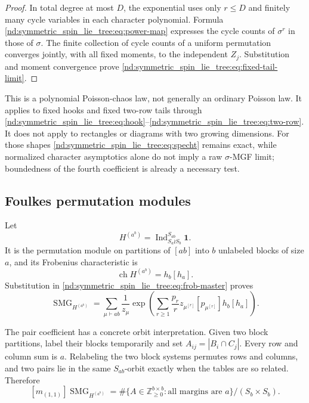 \documentclass[10pt]{article}
\newcommand{\SMG}{\operatorname{SMG}}
\newcommand{\MGF}{\SMG}
\newcommand{\Ind}{\operatorname{Ind}}
\newcommand{\ch}{\operatorname{ch}}
\begin{document}
\begin{proof}
In total degree at most $D$, the exponential uses only $r\le D$ and finitely
many cycle variables in each character polynomial.  Formula
\eqref{nd:symmetric_spin_lie_tree:eq:power-map} expresses the cycle counts of $\sigma^r$ in those of
$\sigma$.  The finite collection of cycle counts of a uniform permutation
converges jointly, with all fixed moments, to the independent $Z_j$.
Substitution and moment convergence prove \eqref{nd:symmetric_spin_lie_tree:eq:fixed-tail-limit}.
\end{proof}

This is a polynomial Poisson-chaos law, not generally an ordinary Poisson
law.  It applies to fixed hooks and fixed two-row tails through
\eqref{nd:symmetric_spin_lie_tree:eq:hook}--\eqref{nd:symmetric_spin_lie_tree:eq:two-row}.  It does not apply to rectangles or
diagrams with two growing dimensions.  For those shapes \eqref{nd:symmetric_spin_lie_tree:eq:specht}
remains exact, while normalized character asymptotics alone do not imply a
raw $\sigma$-MGF limit; boundedness of the fourth coefficient is already a
necessary test.

\subsection{Foulkes permutation modules}

Let
\[
 H^{(a^b)}=\Ind_{S_a\wr S_b}^{S_{ab}}\mathbf1.
\]
It is the permutation module on partitions of $[ab]$ into $b$ unlabeled
blocks of size $a$, and its Frobenius characteristic is
\[
 \ch H^{(a^b)}=h_b[h_a].
\]
Substitution in \eqref{nd:symmetric_spin_lie_tree:eq:frob-master} proves
\begin{equation}\label{nd:symmetric_spin_lie_tree:eq:foulkes}
 \boxed{
 \MGF_{H^{(a^b)}}=
 \sum_{\mu\vdash ab}\frac1{z_\mu}
 \exp\!\left(
 \sum_{r\ge1}\frac{p_r}{r}
 z_{\mu^{[r]}}[p_{\mu^{[r]}}]h_b[h_a]
 \right).}
\end{equation}

The pair coefficient has a concrete orbit interpretation.  Given two block
partitions, label their blocks temporarily and set
$A_{ij}=|B_i\cap C_j|$.  Every row and column sum is $a$.  Relabeling the two
block systems permutes rows and columns, and two pairs lie in the same
$S_{ab}$-orbit exactly when the tables are so related.  Therefore
\begin{equation}\label{nd:symmetric_spin_lie_tree:eq:contingency}
 \boxed{[m_{(1,1)}]\MGF_{H^{(a^b)}}
 =\#\{A\in\mathbb Z_{\ge0}^{b\times b}:
 \text{all margins are }a\}/(S_b\times S_b).}
\end{equation}
\end{document}
